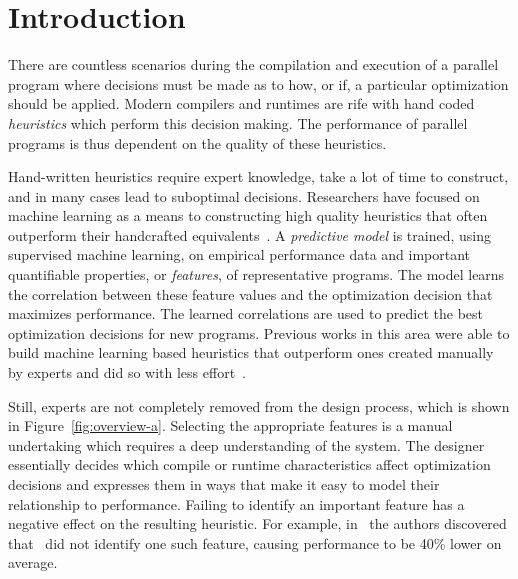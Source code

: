 \section{Introduction}



There are countless scenarios during the compilation and execution of a parallel
program where decisions must be made as to how, or if, a particular optimization
should be applied. Modern compilers and runtimes are rife with hand coded
\emph{heuristics} which perform this decision making. The performance of
parallel programs is thus dependent on the quality of these heuristics.

Hand-written heuristics require expert knowledge, take a lot of time to
construct, and in many cases lead to suboptimal decisions. Researchers have
focused on machine learning as a means to constructing high quality heuristics
that often outperform their handcrafted
equivalents~\cite{Micolet2016,Falch2015,Stephenson2005,Agakov,Cummins2015a}. A
\emph{predictive model} is trained, using supervised machine learning, on
empirical performance data and important quantifiable properties, or
\emph{features}, of representative programs. The model learns the correlation
between these feature values and the optimization decision that maximizes
performance. The learned correlations are used to predict the best optimization
decisions for new programs. Previous works in this area were able to build
machine learning based heuristics that outperform ones created manually by
experts and did so with less effort~\cite{Grewe2013,Magni2014}.

Still, experts are not completely removed from the design process, which is
shown in Figure~\ref{fig:overview-a}. Selecting the appropriate features is a
manual undertaking which requires a deep understanding of the system. The
designer essentially decides which compile or runtime characteristics affect
optimization decisions and expresses them in ways that make it easy to model
their relationship to performance. Failing to identify an important feature has
a negative effect on the resulting heuristic. For example,
in~\cite{Cummins2017a} the authors discovered that~\cite{Grewe2013} did not
identify one such feature, causing performance to be 40\% lower on average.

